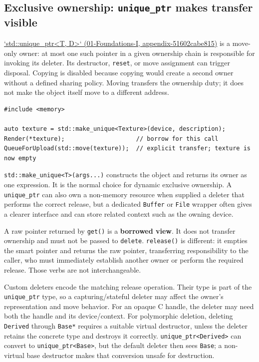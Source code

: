 \subsection{\texorpdfstring{Exclusive ownership: \texttt{unique\_ptr} makes transfer visible}{Exclusive ownership: unique\_ptr makes transfer visible}}\label{05-engine-i-ch004-exclusive-ownership-unique_ptr-makes-transfer-visible}

\href{../01-Foundations-I/main.pdf\#nameddest=appendix-51602cabe815}{`std::unique\_ptr\textless T, D\textgreater` (01-Foundations-I, appendix-51602cabe815)} is a move-only owner: at most one such pointer in a given ownership chain is responsible for invoking its deleter. Its destructor, \texttt{reset}, or move assignment can trigger disposal. Copying is disabled because copying would create a second owner without a defined sharing policy. Moving transfers the ownership duty; it does not make the object itself move to a different address.

\begin{verbatim}
#include <memory>

auto texture = std::make_unique<Texture>(device, description);
Render(*texture);                    // borrow for this call
QueueForUpload(std::move(texture));  // explicit transfer; texture is now empty
\end{verbatim}

\texttt{std::make\_unique\textless{}T\textgreater{}(args...)} constructs the object and returns its owner as one expression. It is the normal choice for dynamic exclusive ownership. A \texttt{unique\_ptr} can also own a non-memory resource when supplied a deleter that performs the correct release, but a dedicated \texttt{Buffer} or \texttt{File} wrapper often gives a clearer interface and can store related context such as the owning device.

A raw pointer returned by \texttt{get()} is a \textbf{borrowed view}. It does not transfer ownership and must not be passed to \texttt{delete}. \texttt{release()} is different: it empties the smart pointer and returns the raw pointer, transferring responsibility to the caller, who must immediately establish another owner or perform the required release. Those verbs are not interchangeable.

Custom deleters encode the matching release operation. Their type is part of the \texttt{unique\_ptr} type, so a capturing/stateful deleter may affect the owner's representation and move behavior. For an opaque C handle, the deleter may need both the handle and its device/context. For polymorphic deletion, deleting \texttt{Derived} through \texttt{Base*} requires a suitable virtual destructor, unless the deleter retains the concrete type and destroys it correctly. \texttt{unique\_ptr\textless{}Derived\textgreater{}} can convert to \texttt{unique\_ptr\textless{}Base\textgreater{}}, but the default deleter then sees \texttt{Base}; a non-virtual base destructor makes that conversion unsafe for destruction.

